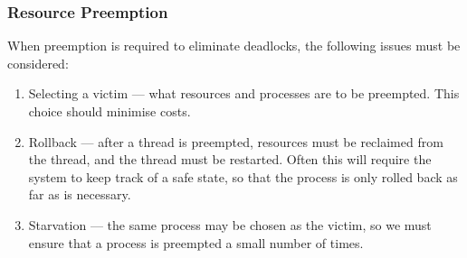 \documentclass{article}
\begin{document}
\subsubsection{Resource Preemption}
When preemption is required to eliminate deadlocks, the following
issues must be considered:
\begin{enumerate}
    \item Selecting a victim --- what resources and processes are to be
          preempted. This choice should minimise costs.
    \item Rollback --- after a thread is preempted, resources must be
          reclaimed from the thread, and the thread must be restarted.
          Often this will require the system to keep track of a safe
          state, so that the process is only rolled back as far as is
          necessary.
    \item Starvation --- the same process may be chosen as the victim,
          so we must ensure that a process is preempted a small number
          of times.
\end{enumerate}
\end{document}
